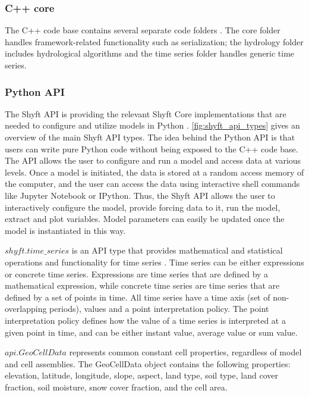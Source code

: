 \subsubsection{C++ core}
The C++ code base contains several separate code folders \autocite{burkhartShyftV4Framework2021}. The core folder handles framework-related functionality such as serialization; the hydrology folder includes hydrological algorithms and the time series folder handles generic time series. 

\subsubsection{Python API}

The Shyft API is providing the relevant Shyft Core implementations that are needed to configure and utilize models in Python \autocite{burkhartShyftV4Framework2021}. \autoref{fig:shyft_api_types} gives an overview of the main Shyft API types. The idea behind the Python API is that users can write pure Python code without being exposed to the C++ code base. The API allows the user to configure and run a model and access data at various levels. Once a model is initiated, the data is stored at a random access memory of the computer, and the user can access the data using interactive shell commands like Jupyter Notebook or IPython. Thus, the Shyft API allows the user to interactively configure the model, provide forcing data to it, run the model, extract and plot variables. Model parameters can easily be updated once the model is instantiated in this way.

$shyft.time\_series$ is an API type that provides mathematical and statistical operations and functionality for time series \autocite{burkhartShyftV4Framework2021}. Time series can be either expressions or concrete time series. Expressions are time series that are defined by a mathematical expression, while concrete time series are time series that are defined by a set of points in time. All time series have a time axis (set of non-overlapping periods), values and a point interpretation policy. The point interpretation policy defines how the value of a time series is interpreted at a given point in time, and can be either instant value, average value or sum value. 

$api.GeoCellData$ represents common constant cell properties, regardless of model and cell assemblies. The GeoCellData object contains the following properties: elevation, latitude, longitude, slope, aspect, land type, soil type, land cover fraction, soil moisture, snow cover fraction, and the cell area.

